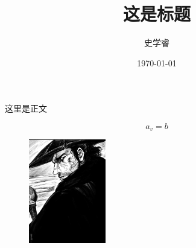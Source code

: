 \documentclass[UTF8]{ctexart}   %
\begin{document}
\title{这是标题}
\date{\today}
\author{史学睿}
\maketitle

这里是正文



\begin{equation}
	a_v=b
\end{equation}

\begin{figure}[!ht]\centering %
	   \includegraphics[width=0.30\textwidth]{Image/xiantu.jpg}       %
	   \caption{}    %
\end{figure}
\end{document}
